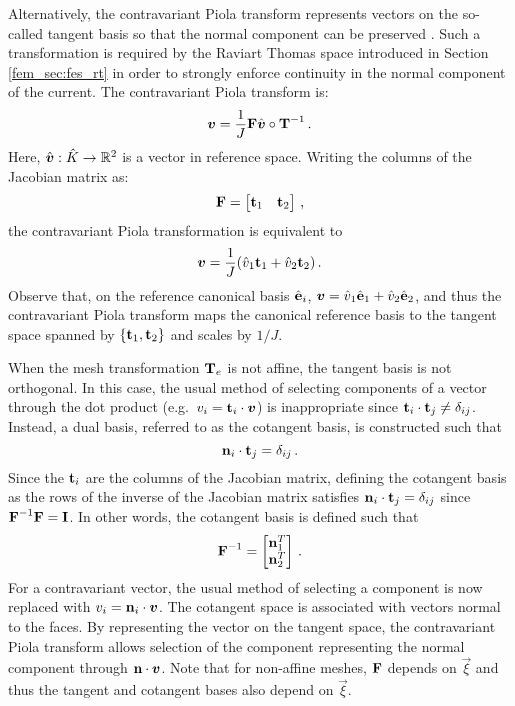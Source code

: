 \documentclass[../doc.tex]{subfiles}
\begin{document}
Alternatively, the contravariant Piola transform represents vectors on the so-called tangent basis so that the normal component can be preserved \cite{ciarlet_elasticity,piola_cisc}. Such a transformation is required by the Raviart Thomas space introduced in Section \ref{fem_sec:fes_rt} in order to strongly enforce continuity in the normal component of the current. The contravariant Piola transform is: 
	\begin{equation} \label{fem:piola}
		\boldsymbol{v} = \frac{1}{J}\boldsymbol{\mathrm{F}}\hat{\boldsymbol{v}}\circ\boldsymbol{\mathrm{T}}^{-1} \,. 
	\end{equation}
Here, $\hat{\boldsymbol{v}} : \hat{K} \rightarrow \mathbb{R}^2$ is a vector in reference space. 
Writing the columns of the Jacobian matrix as:
	\begin{equation}
		\boldsymbol{\mathrm{F}} = \begin{bmatrix} 
			\boldsymbol{\mathrm{t}}_1 & \boldsymbol{\mathrm{t}}_2 
		\end{bmatrix} \,,
	\end{equation}
the contravariant Piola transformation is equivalent to
	\begin{equation}
		\boldsymbol{v} = \frac{1}{J}(\hat{v}_1 \boldsymbol{\mathrm{t}}_1 + \hat{v}_2 \boldsymbol{\mathrm{t}}_2) \,.
	\end{equation}
Observe that, on the reference canonical basis $\hat{\boldsymbol{\mathrm{e}}}_i$, $\boldsymbol{v} = \hat{v}_1 \hat{\boldsymbol{\mathrm{e}}}_1 + \hat{v}_2 \hat{\boldsymbol{\mathrm{e}}}_2$, and thus the contravariant Piola transform maps the canonical reference basis to the tangent space spanned by $\{\boldsymbol{\mathrm{t}}_1,\boldsymbol{\mathrm{t}}_2\}$ and scales by $1/J$. 

When the mesh transformation $\boldsymbol{\mathrm{T}}_e$ is not affine, the tangent basis is not orthogonal. In this case, the usual method of selecting components of a vector through the dot product (e.g.~$v_i = \boldsymbol{\mathrm{t}}_i \cdot \boldsymbol{v}$) is inappropriate since $\boldsymbol{\mathrm{t}}_i \cdot \boldsymbol{\mathrm{t}}_j \neq \delta_{ij}$. Instead, a dual basis, referred to as the cotangent basis, is constructed such that 
	\begin{equation}
		\boldsymbol{\mathrm{n}}_i \cdot \boldsymbol{\mathrm{t}}_j = \delta_{ij} \,. 
	\end{equation}
Since the $\boldsymbol{\mathrm{t}}_i$ are the columns of the Jacobian matrix, defining the cotangent basis as the rows of the inverse of the Jacobian matrix satisfies $\boldsymbol{\mathrm{n}}_i \cdot \boldsymbol{\mathrm{t}}_j = \delta_{ij}$ since $\boldsymbol{\mathrm{F}}^{-1}\boldsymbol{\mathrm{F}} = \boldsymbol{\mathrm{I}}$. In other words, the cotangent basis is defined such that 
	\begin{equation}
		\boldsymbol{\mathrm{F}}^{-1} = \begin{bmatrix} 
			\boldsymbol{\mathrm{n}}_1^T \\ \boldsymbol{\mathrm{n}}_2^T 
		\end{bmatrix} \,. 
	\end{equation}
For a contravariant vector, the usual method of selecting a component is now replaced with $v_i = \boldsymbol{\mathrm{n}}_i \cdot \boldsymbol{v}$. 
The cotangent space is associated with vectors normal to the faces. By representing the vector on the tangent space, the contravariant Piola transform allows selection of the component representing the normal component through $\boldsymbol{\mathrm{n}}\cdot\boldsymbol{v}$. 
Note that for non-affine meshes, $\boldsymbol{\mathrm{F}}$ depends on $\vec{\xi}$ and thus the tangent and cotangent bases also depend on $\vec{\xi}$. 
\end{document}
